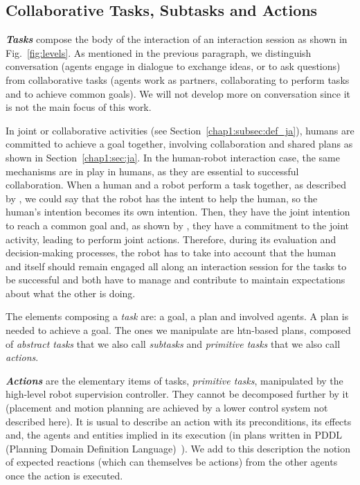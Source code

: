 \documentclass[a4paper,11pt,twoside]{StyleThese}
\begin{document}
\subsection{Collaborative Tasks, Subtasks and Actions}
\textbf{\textit{Tasks}} compose the body of the interaction of an interaction session as shown in Fig.~\ref{fig:levels}. As mentioned in the previous paragraph, we distinguish conversation (\ie agents engage in dialogue to exchange ideas, or to ask questions) from collaborative tasks (\ie agents work as partners, collaborating to perform tasks and to achieve common goals). We will not develop more on conversation since it is not the main focus of this work.

In joint or collaborative activities (see Section~\ref{chap1:subsec:def_ja}), humans are committed to achieve a goal together, involving collaboration and shared plans as shown in Section~\ref{chap1:sec:ja}. In the human-robot interaction case, the same mechanisms are in play in humans, as they are essential to successful collaboration. When a human and a robot perform a task together, as described by \cite{bauer_2008_collab}, we could say that the robot has the intent to help the human, so the human's intention becomes its own intention. Then, they have the joint intention to reach a common goal and, as shown by \cite{michael_2017_commitment}, they have a commitment to the joint activity, leading to perform joint actions. Therefore, during its evaluation and decision-making processes, the robot has to take into account that the human and itself should remain engaged all along an interaction session for the tasks to be successful and both have to manage and contribute to maintain expectations about what the other is doing. 

The elements composing a \textit{task} are: a goal, a plan and involved agents. A plan is needed to achieve a goal. The ones we manipulate are \acrshort{htn}-based plans, composed of \emph{abstract tasks} that we also call \emph{subtasks} and \emph{primitive tasks} that we also call \emph{actions}.

\textbf{\textit{Actions}} are the elementary items of tasks, \emph{primitive tasks}, manipulated by the high-level robot supervision controller. They cannot be decomposed further by it (\eg placement and motion planning are achieved by a lower control system not described here). It is usual to describe an action with its preconditions, its effects and, the agents and entities implied in its execution (\eg in plans written in PDDL (Planning Domain Definition Language)~\citep{ghallab_98_pddl}). We add to this description the notion of expected reactions (which can themselves be actions) from the other agents once the action is executed.
\end{document}
